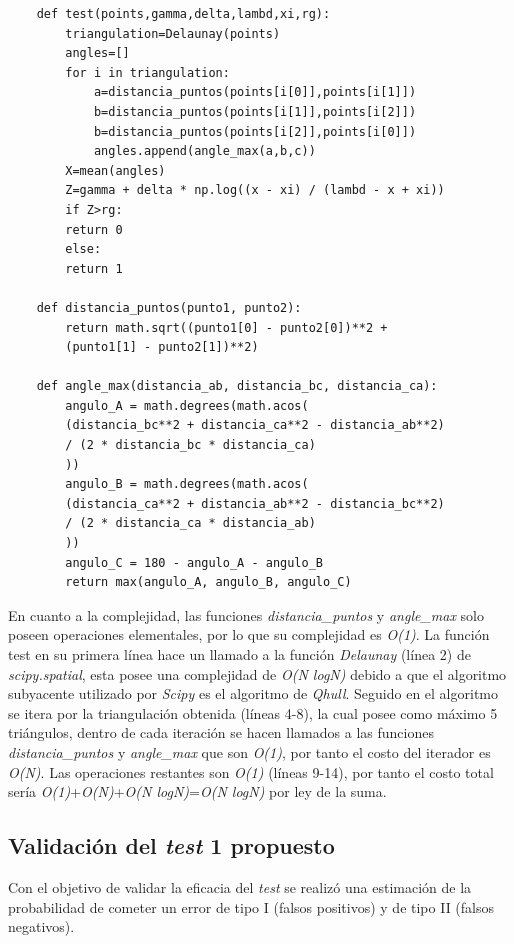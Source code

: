 \documentclass[12pt]{report}
\begin{document}
\begin{lstlisting}
	def test(points,gamma,delta,lambd,xi,rg):
		triangulation=Delaunay(points)
		angles=[]
		for i in triangulation:
			a=distancia_puntos(points[i[0]],points[i[1]])
			b=distancia_puntos(points[i[1]],points[i[2]])
			b=distancia_puntos(points[i[2]],points[i[0]])
			angles.append(angle_max(a,b,c))
		X=mean(angles)
		Z=gamma + delta * np.log((x - xi) / (lambd - x + xi))
		if Z>rg:
		return 0
		else:
		return 1
	
	def distancia_puntos(punto1, punto2):
		return math.sqrt((punto1[0] - punto2[0])**2 +
		(punto1[1] - punto2[1])**2)
	
	def angle_max(distancia_ab, distancia_bc, distancia_ca):
		angulo_A = math.degrees(math.acos(
		(distancia_bc**2 + distancia_ca**2 - distancia_ab**2) 
		/ (2 * distancia_bc * distancia_ca)
		))
		angulo_B = math.degrees(math.acos(
		(distancia_ca**2 + distancia_ab**2 - distancia_bc**2) 
		/ (2 * distancia_ca * distancia_ab)
		))
		angulo_C = 180 - angulo_A - angulo_B  
		return max(angulo_A, angulo_B, angulo_C)
\end{lstlisting}

En cuanto a la complejidad, las funciones \textit{distancia\_puntos} y \textit{angle\_max} solo poseen operaciones elementales, por lo que su complejidad es \textit{O(1)}. La función test en su primera línea hace un llamado a la función  \textit{Delaunay} (línea 2) de \textit{scipy.spatial}, esta posee una complejidad de \textit{O(N logN)} debido a que el algoritmo subyacente utilizado por \textit{Scipy} es el algoritmo de \textit{Qhull}. Seguido en el algoritmo se itera por la triangulación obtenida (líneas 4-8), la cual posee como máximo 5 triángulos, dentro de cada iteración se hacen llamados a las  funciones \textit{distancia\_puntos} y \textit{angle\_max}  que son \textit{O(1)}, por tanto el costo del iterador es \textit{O(N)}. Las operaciones restantes son \textit{O(1)} (líneas 9-14), por tanto el costo total sería \textit{O(1)}+\textit{O(N)}+\textit{O(N logN)}=\textit{O(N logN)} por ley de la suma.
\subsection{Validación del \textit{test} 1 propuesto}
\label{sec:1.4}
	
	Con el objetivo de validar la eficacia del \textit{test} se realizó una estimación de la probabilidad de cometer un error de tipo I (falsos positivos) y de tipo II (falsos negativos).
		 
\end{document}

